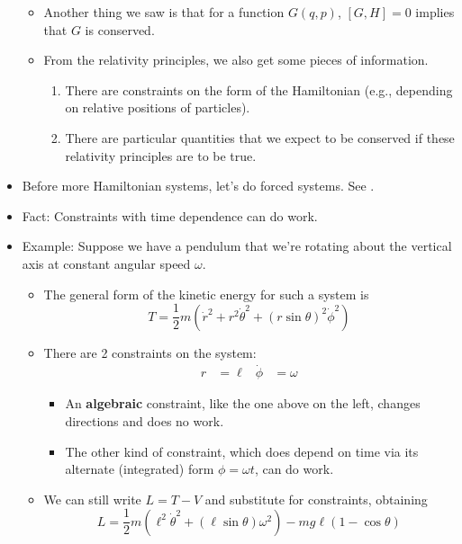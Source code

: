 \documentclass[../notes.tex]{subfiles}
\begin{document}
\begin{itemize}
\begin{itemize}
        \item Another thing we saw is that for a function $G(q,p)$, $[G,H]=0$ implies that $G$ is conserved.
        \item From the relativity principles, we also get some pieces of information.
        \begin{enumerate}
            \item There are constraints on the form of the Hamiltonian (e.g., depending on relative positions of particles).
            \item There are particular quantities that we expect to be conserved if these relativity principles are to be true.
        \end{enumerate}
    \end{itemize}
    \item Before more Hamiltonian systems, let's do forced systems. See \textcite[231-42]{bib:KibbleBerkshire}.
    \item Fact: Constraints with time dependence can do work.
    \item Example: Suppose we have a pendulum that we're rotating about the vertical axis at constant angular speed $\omega$.
    \begin{itemize}
        \item The general form of the kinetic energy for such a system is
        \begin{equation*}
            T = \frac{1}{2}m(\dot{r}^2+r^2\dot{\theta}^2+(r\sin\theta)^2\dot{\phi}^2)
        \end{equation*}
        \item There are 2 constraints on the system:
        \begin{align*}
            r &= \ell&
            \dot{\phi} &= \omega
        \end{align*}
        \begin{itemize}
            \item An \textbf{algebraic} constraint, like the one above on the left, changes directions and does no work.
            \item The other kind of constraint, which does depend on time via its alternate (integrated) form $\phi=\omega t$, can do work.
        \end{itemize}
        \item We can still write $L=T-V$ and substitute for constraints, obtaining
        \begin{equation*}
            L = \frac{1}{2}m(\ell^2\dot{\theta}^2+(\ell\sin\theta)\omega^2)-mg\ell(1-\cos\theta)

\end{equation*}
\end{itemize}
\end{itemize}
\end{document}
